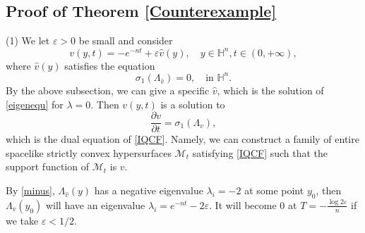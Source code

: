 \documentclass[reqno]{amsart}
\theoremstyle{remark}
\renewcommand{\H}{{\mathbb{H}}}
\newcommand{\pd}[2]{\frac{\partial {#1}}{\partial {#2}}}
\theoremstyle{definition}
\numberwithin{equation}{section}
\begin{document}
\subsection{Proof of Theorem \ref{Counterexample}}

\par (1) We let \(\varepsilon > 0\) be small and consider
\begin{equation}\label{eq:v} 
v(y,t) = -e^{-nt} + \varepsilon \hat{v}(y),\quad y\in \H^n, t\in(0,+\infty),
\end{equation}
where \(\hat{v}(y)\) satisfies the equation 
\begin{equation}\label{eq:eigenvalue-eq-v} 
    \sigma_1(\Lambda_{\hat{v}}) = 0,\quad \text{in } \H^n. 
\end{equation}
By the above subsection, we can give a specific $\hat{v}$, which is the solution of \eqref{eigenequ} for $\lambda=0$.  
Then \(v(y,t)\) is a solution to 
\[ \pd{v}{t} = \sigma_1(\Lambda_v),  \]
which is the dual equation of \eqref{IQCF}. Namely, we can construct a family of entire spacelike strictly convex hypersurfaces $\mathcal{M}_t$ satisfying \eqref{IQCF} such that the support function of $\mathcal{M}_t$ is $v$.


By  \eqref{minus},  \(\Lambda_{\hat{v}}(y)\) has a negative eigenvalue \(\lambda_i = -2\) at some point \(y_0\), then \(\Lambda_v(y_0)\) will have an eigenvalue \(\lambda_i = e^{-nt}-2\varepsilon \). It will become \(0\) at $T=-\frac{\log 2\varepsilon}{n}$ if we take \(\varepsilon < 1/2\).
\end{document}
